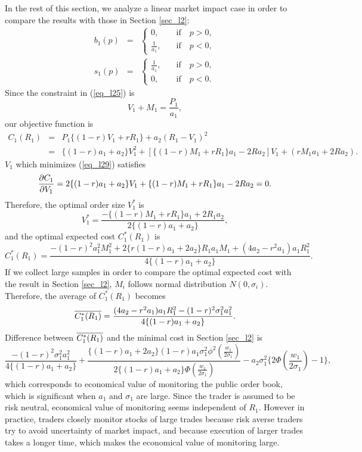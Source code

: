 In the rest of this section, we analyze a linear market impact case in order to compare the results with those in Section \ref{sec_l2}:
\begin{eqnarray*}
  b_1(p) & = & \left\{
  \begin{array}{ll}
   0, & \quad \mbox{if} \quad p>0, \\
   \frac{1}{a_1}, & \quad \mbox{if} \quad p<0,
  \end{array}
  \right. \label{eq_l26}\\
  s_1(p) & = & \left\{
  \begin{array}{ll}
   \frac{1}{a_1}, & \quad \mbox{if} \quad p>0, \\
   0, & \quad \mbox{if} \quad p<0.
  \end{array}
  \right. \label{eq_l27}
\end{eqnarray*}
Since the constraint in (\ref{eq_l25}) is
\[ %
  V_1+M_1=\frac{P_1}{a_1},
\] %
our objective function is
\begin{eqnarray}\label{eq_l29}
  C_1(R_1) & = & P_1 \{(1-r) V_1 +r R_1\}+a_2(R_1-V_1)^2 \nonumber \\
      & = & \{(1-r)a_1+a_2\}V_1^2+[\{(1-r)M_1+rR_1\}a_1-2Ra_2]V_1+(rM_1a_1+2Ra_2).
\end{eqnarray}
$V_1$ which minimizes (\ref{eq_l29}) satisfies
\[ %
  \pdif{C_1}{V_1}=2\{(1-r)a_1+a_2\}V_1+\{(1-r)M_1+rR_1\}a_1-2Ra_2=0.
\] %
Therefore, the optimal order size $V_1^*$ is
\[ %
  V_1^*=\frac{-\{(1-r)M_1+rR_1\}a_1+2R_1a_2}{2\{(1-r)a_1+a_2\}},
\] %
and the optimal expected cost $C_1^*(R_1)$ is
\[ %
  C_1^*(R_1) = \frac{-(1-r)^2a_1^2 M_1^2+2\{r(1-r)a_1+2a_2\}R_1 a_1 M_1+(4a_2-r^2a_1)a_1R_1^2}{4\{(1-r)a_1+a_2\}}.
\] %
If we collect large samples in order to compare the optimal expected cost with the result in Section \ref{sec_l2}, $M_i$ follows normal distribution $N(0,\sigma_i)$.  Therefore, the average of $C_1^*(R_1)$ becomes
\[ %
  \ol{C_1^*(R_1)} = \frac{(4a_2-r^2a_1)a_1R_1^2-(1-r)^2\sigma_1^2a_1^2}{4\{(1-r)a_1+a_2\}}.
\] %
Difference between $\overline{C_1^*(R_1)}$ and the minimal cost in Section \ref{sec_l2} is
\[ %
  \frac{-(1-r)^2\sigma_1^2a_1^2}{4\{(1-r)a_1+a_2\}} + \frac{\{(1-r)a_1+2a_2\}(1-r)a_1\sigma_1^2\phi^2(\frac{w_1}{2\sigma_1})}{2\{(1-r)a_1+a_2\}\Phi(\frac{w_1}{2\sigma_1})} - a_2\sigma_1^2\{2\Phi(\frac{w_1}{2\sigma_1})-1\},
\] %
which corresponds to economical value of monitoring the public order book, which is significant when $a_1$ and $\sigma_1$ are large.  Since the trader is assumed to be risk neutral, economical value of monitoring seems independent of $R_1$.  However in practice, traders closely monitor stocks of large trades because risk averse traders try to avoid uncertainty of market impact, and because execution of larger trades takes a longer time, which makes the economical value of monitoring large.

